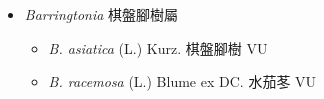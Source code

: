 
  \begin{itemize}
 \item[] \textit{Barringtonia} 棋盤腳樹屬
                                
  \begin{itemize}
        \item[] \textit{B. asiatica} (L.) Kurz.  棋盤腳樹   VU
        \item[] \textit{B. racemosa} (L.) Blume ex DC.  水茄苳   VU
  \end{itemize}
  \end{itemize}
